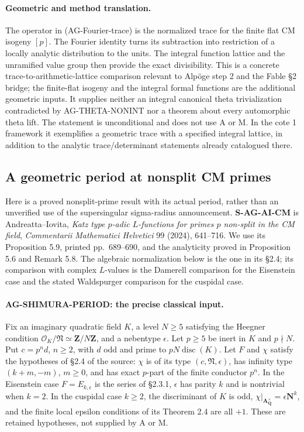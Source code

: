 \documentclass[11pt,a4paper]{article}
\begin{document}
\paragraph{Geometric and method translation.}
The operator in (AG-Fourier-trace) is the normalized trace for the finite
flat CM isogeny $[p]$.  The Fourier identity turns its subtraction into
restriction of a locally analytic distribution to the units.  The
integral function lattice and the unramified value group then provide
the exact divisibility.  This is a concrete trace-to-arithmetic-lattice
comparison relevant to Alpöge step 2 and the Fable \S2 bridge; the
finite-flat isogeny and the integral formal functions are the additional
geometric inputs.  It supplies neither an integral canonical theta
trivialization contradicted by AG-THETA-NONINT nor a theorem about
every automorphic theta lift.  The statement is unconditional and
does not use A or M.  In the cote 1 framework it exemplifies a
geometric trace with a specified integral lattice, in addition to the
analytic trace/determinant statements already catalogued there.

\subsection{A geometric period at nonsplit CM primes}

Here is a proved nonsplit-prime result with its actual period, rather
than an unverified use of the supersingular sigma-radius announcement.
\textbf{S-AG-AI-CM} is Andreatta--Iovita, \emph{Katz type $p$-adic
$L$-functions for primes $p$ non-split in the CM field},
\emph{Commentarii Mathematici Helvetici} 99 (2024), 641--716.
We use its Proposition 5.9, printed pp.~689--690, and the analyticity
proved in Proposition 5.6 and Remark 5.8.  The algebraic normalization
below is the one in its \S2.4; its comparison with complex $L$-values
is the Damerell comparison for the Eisenstein case and the stated
Waldspurger comparison for the cuspidal case.

\paragraph{AG-SHIMURA-PERIOD: the precise classical input.}
Fix an imaginary quadratic field $K$, a level $N\geq5$ satisfying the
Heegner condition $\mathcal O_K/\mathfrak N\simeq\mathbf Z/N\mathbf Z$,
and a nebentype $\epsilon$.  Let $p\geq5$ be inert in $K$ and
$p\nmid N$.  Put $c=p^n d$, $n\geq2$, with $d$ odd and prime to
$pN\operatorname{disc}(K)$.  Let $F$ and $\chi$ satisfy the hypotheses
of \S2.4 of the source: $\chi$ is of its type $(c,\mathfrak N,\epsilon)$,
has infinity type $(k+m,-m)$, $m\geq0$, and has exact $p$-part of
the finite conductor $p^n$.  In the Eisenstein case $F=E_{k,\epsilon}$
is the series of \S2.3.1, $\epsilon$ has parity $k$ and is nontrivial
when $k=2$.  In the cuspidal case $k\geq2$, the discriminant of $K$
is odd, $\chi|_{\mathbf A_{\mathbf Q}^{\times}}=\epsilon\mathbf N^k$,
and the finite local epsilon conditions of its Theorem 2.4 are all
$+1$.  These are retained hypotheses, not supplied by A or M.
\end{document}
